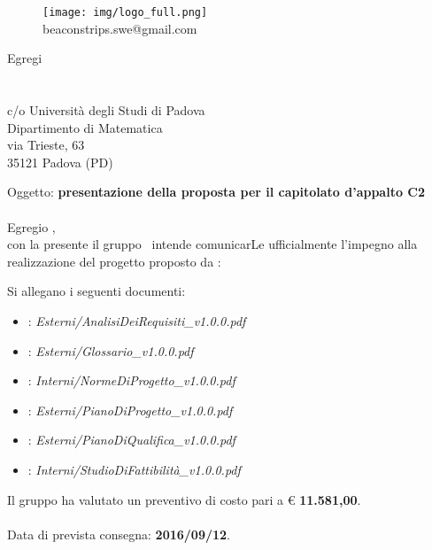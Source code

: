 \documentclass[a4paper]{article}
\newcommand{\spazio}{\vspace{1.5cm}}
\begin{document}
\spazio
\begin{figure}[!h]
	\centering
	\texttt{[image: img/logo\_full.png]} \\
	beaconstrips.swe@gmail.com
\end{figure}

\spazio

\begin{flushright}
\date{\today}
Egregi \\
\COMMITTENTE \\
\CARDIN \\
c/o Università degli Studi di Padova  \\
Dipartimento di Matematica \\
via Trieste, 63 \\
35121 Padova (PD)
\end{flushright}
\spazio

Oggetto: \textbf{presentazione della proposta per il capitolato d'appalto C2} \\ \\
Egregio \COMMITTENTE,\\
con la presente il gruppo \AUTORE \ intende comunicarLe ufficialmente l'impegno alla realizzazione del progetto proposto da \PROPONENTE: \\

Si allegano i seguenti documenti:
\begin{itemize}
	\item \textbf{\ARdoc}: \textit{Esterni/AnalisiDeiRequisiti\_v1.0.0.pdf}
	\item \textbf{\Gldoc}: \textit{Esterni/Glossario\_v1.0.0.pdf}
	\item \textbf{\NPdoc}: \textit{Interni/NormeDiProgetto\_v1.0.0.pdf}
	\item \textbf{\PPdoc}: \textit{Esterni/PianoDiProgetto\_v1.0.0.pdf}
	\item \textbf{\PQdoc}: \textit{Esterni/PianoDiQualifica\_v1.0.0.pdf}
	\item \textbf{\SFdoc}: \textit{Interni/StudioDiFattibilità\_v1.0.0.pdf}
\end{itemize}
\spazio

Il gruppo \AUTORE ha valutato un preventivo di costo pari a \euro{} \textbf{11.581,00}. \\ \\
Data di prevista consegna: \textbf{2016/09/12}. \\
\spazio
\end{document}
